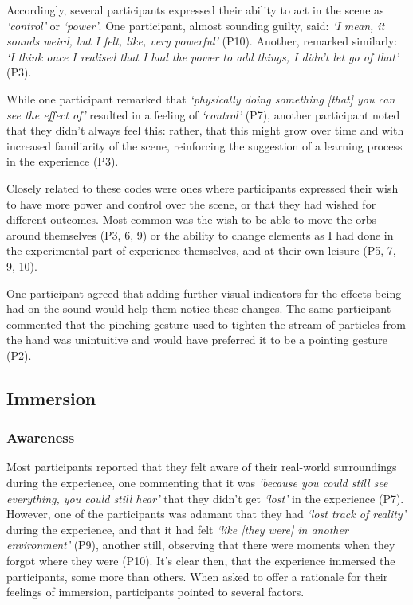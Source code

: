 Accordingly, several participants expressed their ability to act in the scene as \textit{`control'} or \textit{`power'}. One participant, almost sounding guilty, said: \textit{`I mean, it sounds weird, but I felt, like, very powerful'} (P10). Another, remarked similarly: \textit{`I think once I realised that I had the power to add things, I didn't let go of that'} (P3).

While one participant remarked that \textit{`physically doing something [that] you can see the effect of'} resulted in a feeling of \textit{`control'} (P7), another participant noted that they didn't always feel this: rather, that this might grow over time and with increased familiarity of the scene, reinforcing the suggestion of a learning process in the experience (P3).

Closely related to these codes were ones where participants expressed their wish to have more power and control over the scene, or that they had wished for different outcomes. Most common was the wish to be able to move the orbs around themselves (P3, 6, 9) or the ability to change elements as I had done in the experimental part of experience themselves, and at their own leisure (P5, 7, 9, 10).

One participant agreed that adding further visual indicators for the effects being had on the sound would help them notice these changes. The same participant commented that the pinching gesture used to tighten the stream of particles from the hand was unintuitive and would have preferred it to be a pointing gesture (P2).

\subsection{Immersion}\label{sec: polaris-feedback-immersion}
\subsubsection{Awareness}\label{sec: polaris-feedback-immersion-awareness}
Most participants reported that they felt aware of their real-world surroundings during the experience, one commenting that it was \textit{`because you could still see everything, you could still hear'} that they didn't get \textit{`lost'} in the experience (P7). However, one of the participants was adamant that they had \textit{`lost track of reality'} during the experience, and that it had felt \textit{`like [they were] in another environment'} (P9), another still, observing that there were moments when they forgot where they were (P10). It's clear then, that the experience immersed the participants, some more than others. When asked to offer a rationale for their feelings of immersion, participants pointed to several factors.


